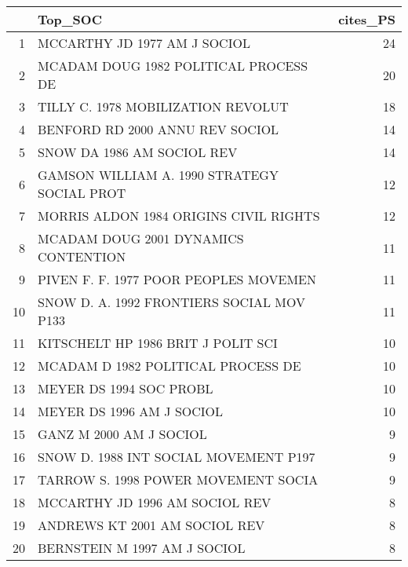 \begin{table}[ht]
\centering
\begin{tabular}{rlr}
  \hline
 & Top\_SOC & cites\_PS \\ 
  \hline
1 & MCCARTHY JD 1977 AM J SOCIOL  & 24 \\ 
  2 & MCADAM DOUG 1982 POLITICAL PROCESS DE & 20 \\ 
  3 & TILLY C. 1978 MOBILIZATION REVOLUT & 18 \\ 
  4 & BENFORD RD 2000 ANNU REV SOCIOL  & 14 \\ 
  5 & SNOW DA 1986 AM SOCIOL REV  & 14 \\ 
  6 & GAMSON WILLIAM A. 1990 STRATEGY SOCIAL PROT & 12 \\ 
  7 & MORRIS ALDON 1984 ORIGINS CIVIL RIGHTS & 12 \\ 
  8 & MCADAM DOUG 2001 DYNAMICS CONTENTION & 11 \\ 
  9 & PIVEN F. F. 1977 POOR PEOPLES MOVEMEN & 11 \\ 
  10 & SNOW D. A. 1992 FRONTIERS SOCIAL MOV P133 & 11 \\ 
  11 & KITSCHELT HP 1986 BRIT J POLIT SCI  & 10 \\ 
  12 & MCADAM D 1982 POLITICAL PROCESS DE & 10 \\ 
  13 & MEYER DS 1994 SOC PROBL  & 10 \\ 
  14 & MEYER DS 1996 AM J SOCIOL  & 10 \\ 
  15 & GANZ M 2000 AM J SOCIOL  & 9 \\ 
  16 & SNOW D. 1988 INT SOCIAL MOVEMENT P197 & 9 \\ 
  17 & TARROW S. 1998 POWER MOVEMENT SOCIA & 9 \\ 
  18 & MCCARTHY JD 1996 AM SOCIOL REV  & 8 \\ 
  19 & ANDREWS KT 2001 AM SOCIOL REV  & 8 \\ 
  20 & BERNSTEIN M 1997 AM J SOCIOL  & 8 \\ 
   \hline
\end{tabular}
\end{table}
